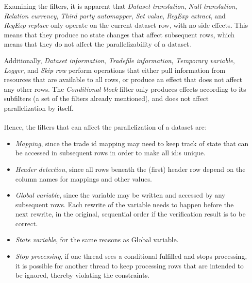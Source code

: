 Examining the filters, it is apparent that \textit{Dataset translation}, \textit{Null translation}, \textit{Relation currency},
\textit{Third party automapper}, \textit{Set value}, \textit{RegExp extract}, and \textit{RegExp replace} only operate on the current dataset row, with no side effects.
This means that they produce no state changes that affect subsequent rows, which means that they do not affect the parallelizability of a dataset.

Additionally, \textit{Dataset information}, \textit{Tradefile information}, \textit{Temporary variable}, \textit{Logger}, and \textit{Skip row} perform
operations that either pull information from resources that are available to all rows, or produce an effect that does not affect any other rows.
The \textit{Conditional block} filter only produces effects according to its subfilters (a set of the filters already mentioned), and does not affect parallelization by itself.
\\\\
Hence, the filters that can affect the parallelization of a dataset are:
\begin{itemize}
  \item \textit{Mapping}, since the trade id mapping may need to keep track of state that can be accessed in subsequent rows in order to make all id:s unique.
  \item \textit{Header detection}, since all rows beneath the (first) header row depend on the column names for mappings and other values.
  \item \textit{Global variable}, since the variable may be written and accessed by any subsequent rows. Each rewrite of the variable needs to happen before the next rewrite,
    in the original, sequential order if the verification result is to be correct.
  \item \textit{State variable}, for the same reasons as Global variable.
  \item \textit{Stop processing}, if one thread sees a conditional fulfilled and stops processing, it is possible for another thread to keep processing rows that are intended
    to be ignored, thereby violating the constraints.
\end{itemize}

